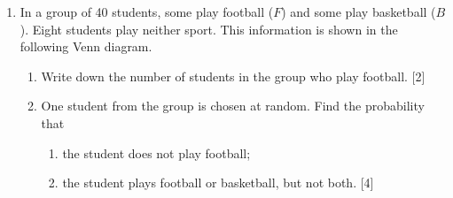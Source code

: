 \documentclass[12pt, twoside]{article}
\begin{document}
\begin{enumerate}[itemsep=0.1cm]
\newpage

\item In a group of 40 students, some play football ($F$) and some play basketball ($B$).
Eight students play neither sport. This information is shown in the following Venn diagram.

\begin{center}
\end{center}

\begin{enumerate}[itemsep=0.25cm]
  \item Write down the number of students in the group who play football. \hfill [2]
  \item One student from the group is chosen at random. Find the probability that
  \begin{enumerate}[label=(\roman*), itemsep=0.25cm]
    \item the student does not play football;
    \item the student plays football or basketball, but not both. \hfill [4]
  \end{enumerate}
\end{enumerate}


\end{enumerate}
\end{document}
